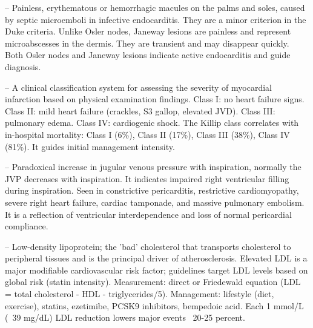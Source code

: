 -- Painless, erythematous or hemorrhagic macules on the palms and soles, caused by septic microemboli in infective endocarditis. They are a minor criterion in the Duke criteria. Unlike Osler nodes, Janeway lesions are painless and represent microabscesses in the dermis. They are transient and may disappear quickly. Both Osler nodes and Janeway lesions indicate active endocarditis and guide diagnosis.

-- A clinical classification system for assessing the severity of myocardial infarction based on physical examination findings. Class I: no heart failure signs. Class II: mild heart failure (crackles, S3 gallop, elevated JVD). Class III: pulmonary edema. Class IV: cardiogenic shock. The Killip class correlates with in-hospital mortality: Class I (6\%), Class II (17\%), Class III (38\%), Class IV (81\%). It guides initial management intensity.

-- Paradoxical increase in jugular venous pressure with inspiration, normally the JVP decreases with inspiration. It indicates impaired right ventricular filling during inspiration. Seen in constrictive pericarditis, restrictive cardiomyopathy, severe right heart failure, cardiac tamponade, and massive pulmonary embolism. It is a reflection of ventricular interdependence and loss of normal pericardial compliance.

-- Low-density lipoprotein; the 'bad' cholesterol that transports cholesterol to peripheral tissues and is the principal driver of atherosclerosis. Elevated LDL is a major modifiable cardiovascular risk factor; guidelines target LDL levels based on global risk (statin intensity). Measurement: direct or Friedewald equation (LDL = total cholesterol - HDL - triglycerides/5). Management: lifestyle (diet, exercise), statins, ezetimibe, PCSK9 inhibitors, bempedoic acid. Each 1 mmol/L (~39 mg/dL) LDL reduction lowers major events ~20-25 percent.

